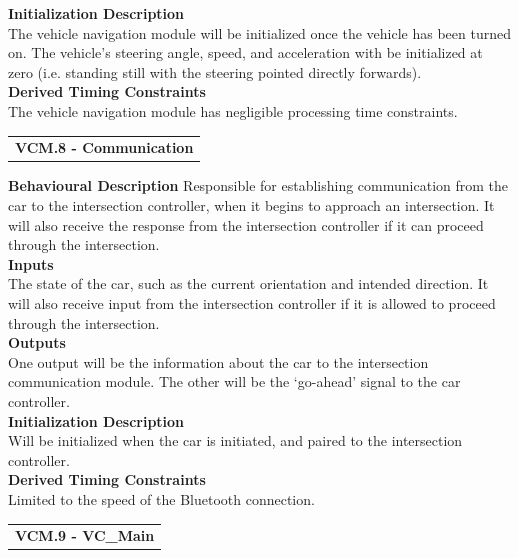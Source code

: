 \documentclass [10pt]{article}
\begin{document}
\textbf{Initialization Description} \\
The vehicle navigation module will be initialized once the vehicle has been turned on. The vehicle's steering angle, speed, and acceleration with be initialized at zero (i.e. standing still with the steering pointed directly forwards). \\

\textbf{Derived Timing Constraints} \\
The vehicle navigation module has negligible processing time constraints. \\

\begin{longtable}{p{}}
\rowcolor{tableCell}\textbf{VCM.8 - Communication} \\
\end{longtable}

\textbf{Behavioural Description} 
Responsible for establishing communication from the car to the intersection controller, when it begins to approach an intersection. It will also receive the response from the intersection controller if it can proceed through the intersection.
\\

\textbf{Inputs} \\
    The state of the car, such as the current orientation and intended direction. It will also receive input from the intersection controller if it is allowed to proceed through the intersection. \\

\textbf{Outputs} \\
    One output will be the information about the car to the intersection communication module. The other will be the `go-ahead' signal to the car controller.\\

\textbf{Initialization Description} \\
 Will be initialized when the car is initiated, and paired to the intersection controller.\\

\textbf{Derived Timing Constraints} \\
Limited to the speed of the Bluetooth connection.  \\




\begin{longtable}{p{}}
\rowcolor{tableCell}\textbf{VCM.9 - VC\_Main} \\
\end{longtable}
\end{document}
